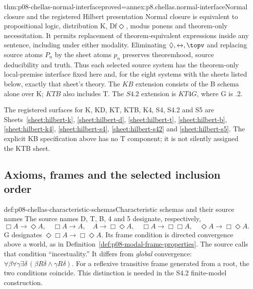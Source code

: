 \begin{hblemma}{thm:p08-chellas-normal-interface}{proved=annex:p8.chellas.normal-interface}{Normal closure and the registered Hilbert presentation}
Normal closure is equivalent to propositional logic, distribution K,
\(\mathrm{Df}\Diamond\), modus ponens and theorem-only
necessitation. It permits replacement of theorem-equivalent expressions
inside any sentence, including under either modality. Eliminating
\(\Diamond,\leftrightarrow,\topv\) and replacing source atoms
\(P_n\) by the sheet atoms \(p_n\) preserves theoremhood,
source deducibility and truth. Thus each selected source system has
the theorem-only local-premise interface fixed here and, for the eight
systems with the sheets listed below, exactly that sheet's theory. The \(KB\)
extension consists of the B schema alone over K; \(KTB\) also includes
T. The \(S4.2\) extension is \(KT4G\), where G is .2.
\end{hblemma}

The registered surfaces for K, KD, KT, KTB, K4, S4, S4.2 and S5
are Sheets~\ref{sheet:hilbert-k}, \ref{sheet:hilbert-d},
\ref{sheet:hilbert-t}, \ref{sheet:hilbert-b}, \ref{sheet:hilbert-k4},
\ref{sheet:hilbert-s4}, \ref{sheet:hilbert-s42} and
\ref{sheet:hilbert-s5}. The explicit KB specification above has no T
component; it is not silently assigned the KTB sheet.

\subsection{Axioms, frames and the selected inclusion order}

\begin{hbdefinition}{def:p08-chellas-characteristic-schemas}{Characteristic schemas and their source names}
The source names D, T, B, 4 and 5 designate, respectively,
\[
 \Box A\to\Diamond A,\quad \Box A\to A,\quad
 A\to\Box\Diamond A,\quad \Box A\to\Box\Box A,\quad
 \Diamond A\to\Box\Diamond A.
\]
G designates \(\Diamond\Box A\to\Box\Diamond A\).
Its frame condition is directed convergence above a world, as in
Definition~\ref{def:p08-modal-frame-properties}. The source calls that
condition ``incestuality.'' It differs from \emph{global} convergence:
\(\forall\beta\forall\gamma\exists\delta\,
 (\beta R\delta\land\gamma R\delta)\).
For a reflexive transitive frame generated from a root, the two conditions
coincide. This distinction is needed in the S4.2 finite-model construction.
\end{hbdefinition}

